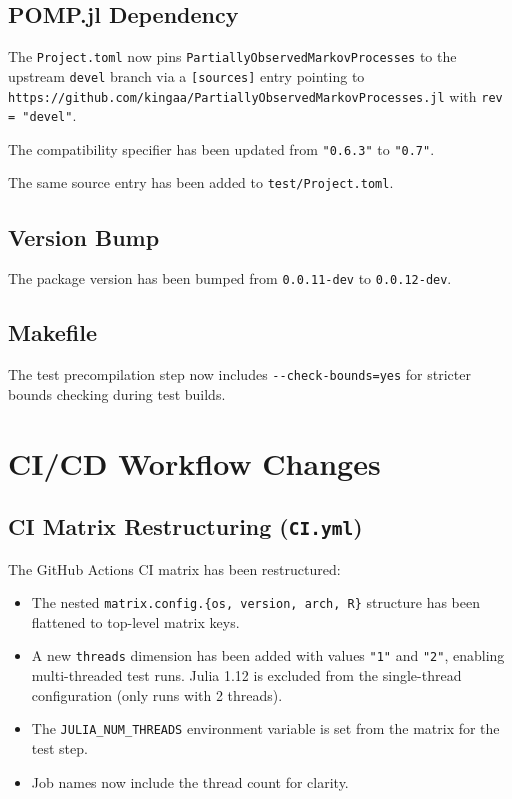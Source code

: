 \documentclass[11pt,letterpaper]{article}
\begin{document}
\subsection{POMP.jl Dependency}

The \texttt{Project.toml} now pins
\texttt{PartiallyObservedMarkovProcesses} to the upstream
\texttt{devel} branch via a \texttt{[sources]} entry pointing to\\
\texttt{https://github.com/kingaa/PartiallyObservedMarkovProcesses.jl}
with \texttt{rev = "devel"}.

The compatibility specifier has been updated from
\texttt{"0.6.3"} to \texttt{"0.7"}.

The same source entry has been added to \texttt{test/Project.toml}.

\subsection{Version Bump}

The package version has been bumped from \texttt{0.0.11-dev} to
\texttt{0.0.12-dev}.

\subsection{Makefile}

The test precompilation step now includes
\texttt{-{}-check-bounds=yes} for stricter bounds checking during
test builds.

\section{CI/CD Workflow Changes}

\subsection{CI Matrix Restructuring (\texttt{CI.yml})}

The GitHub Actions CI matrix has been restructured:

\begin{itemize}
  \item The nested \texttt{matrix.config.\{os, version, arch, R\}}
        structure has been flattened to top-level matrix keys.
  \item A new \texttt{threads} dimension has been added with values
        \texttt{"1"} and \texttt{"2"}, enabling multi-threaded test
        runs. Julia 1.12 is excluded from the single-thread
        configuration (only runs with 2 threads).
  \item The \texttt{JULIA\_NUM\_THREADS} environment variable is set
        from the matrix for the test step.
  \item Job names now include the thread count for clarity.
\end{itemize}
\end{document}
